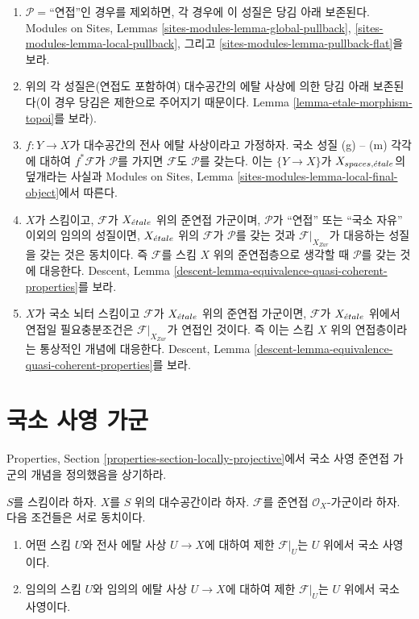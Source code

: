 \begin{enumerate}
\item $\mathcal{P}=$``연접''인 경우를 제외하면, 각 경우에 이 성질은
당김 아래 보존된다. Modules on Sites, Lemmas
\ref{sites-modules-lemma-global-pullback},
\ref{sites-modules-lemma-local-pullback}, 그리고
\ref{sites-modules-lemma-pullback-flat}을 보라.
\item 위의 각 성질은(연접도 포함하여) 대수공간의 에탈 사상에 의한
당김 아래 보존된다(이 경우 당김은 제한으로 주어지기 때문이다.
Lemma \ref{lemma-etale-morphism-topoi}를 보라).
\item $f : Y \to X$가 대수공간의 전사 에탈 사상이라고 가정하자.
국소 성질 (g) -- (m) 각각에 대하여 $f^*\mathcal{F}$가
$\mathcal{P}$를 가지면 $\mathcal{F}$도 $\mathcal{P}$를 갖는다.
이는 $\{Y \to X\}$가 $X_{spaces, {\acute{e}tale}}$의 덮개라는 사실과
Modules on Sites, Lemma
\ref{sites-modules-lemma-local-final-object}에서 따른다.
\item $X$가 스킴이고, $\mathcal{F}$가 $X_{\acute{e}tale}$ 위의 준연접 가군이며,
$\mathcal{P}$가 ``연접'' 또는 ``국소 자유'' 이외의 임의의 성질이면,
$X_{\acute{e}tale}$ 위의 $\mathcal{F}$가 $\mathcal{P}$를 갖는 것과
$\mathcal{F}|_{X_{Zar}}$가 대응하는 성질을 갖는 것은 동치이다.
즉 $\mathcal{F}$를 스킴 $X$ 위의 준연접층으로 생각할 때
$\mathcal{P}$를 갖는 것에 대응한다. Descent, Lemma
\ref{descent-lemma-equivalence-quasi-coherent-properties}를 보라.
\item $X$가 국소 뇌터 스킴이고 $\mathcal{F}$가 $X_{\acute{e}tale}$ 위의
준연접 가군이면, $\mathcal{F}$가 $X_{\acute{e}tale}$ 위에서 연접일
필요충분조건은 $\mathcal{F}|_{X_{Zar}}$가 연접인 것이다. 즉 이는 스킴
$X$ 위의 연접층이라는 통상적인 개념에 대응한다. Descent, Lemma
\ref{descent-lemma-equivalence-quasi-coherent-properties}를 보라.
\end{enumerate}


\section{국소 사영 가군}
\label{section-locally-projective}

\noindent
Properties, Section \ref{properties-section-locally-projective}에서
국소 사영 준연접 가군의 개념을 정의했음을 상기하라.

\begin{lemma}
\label{lemma-locally-projective}
$S$를 스킴이라 하자. $X$를 $S$ 위의 대수공간이라 하자.
$\mathcal{F}$를 준연접 $\mathcal{O}_X$-가군이라 하자.
다음 조건들은 서로 동치이다.
\begin{enumerate}
\item 어떤 스킴 $U$와 전사 에탈 사상 $U \to X$에 대하여 제한
$\mathcal{F}|_U$는 $U$ 위에서 국소 사영이다.
\item 임의의 스킴 $U$와 임의의 에탈 사상 $U \to X$에 대하여 제한
$\mathcal{F}|_U$는 $U$ 위에서 국소 사영이다.
\end{enumerate}
\end{lemma}

